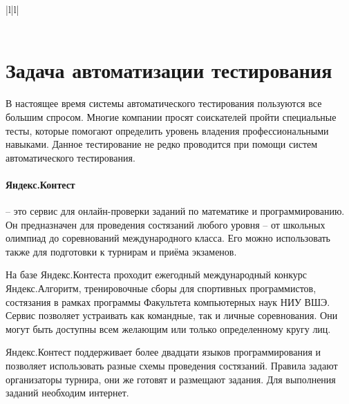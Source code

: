 \begin{table}[]
\begin{tabular}{|l|l|}
		                                                                                                                                                                                                                                                                             \\ \hline
		                                                                                \\  \hline
	\end{tabular}
\end{table}

\section{ Задача автоматизации тестирования }
В настоящее время системы автоматического тестирования пользуются все большим спросом. Многие компании просят соискателей пройти специальные тесты, которые помогают определить уровень владения профессиональными навыками. Данное тестирование не редко проводится при помощи систем автоматического тестирования.

\paragraph{Яндекс.Контест} -- это сервис для онлайн-проверки заданий по математике и программированию. Он предназначен для проведения состязаний любого уровня -- от школьных олимпиад до соревнований международного класса. Его можно использовать также для подготовки к турнирам и приёма экзаменов.

На базе Яндекс.Контеста проходит ежегодный международный конкурс Яндекс.Алгоритм, тренировочные сборы для спортивных программистов, состязания в рамках программы Факультета компьютерных наук НИУ ВШЭ. Сервис позволяет устраивать как командные, так и личные соревнования. Они могут быть доступны всем желающим или только определенному кругу лиц.

Яндекс.Контест поддерживает более двадцати языков программирования и позволяет использовать разные схемы проведения состязаний. Правила задают организаторы турнира, они же готовят и размещают задания. Для выполнения заданий необходим интернет.

